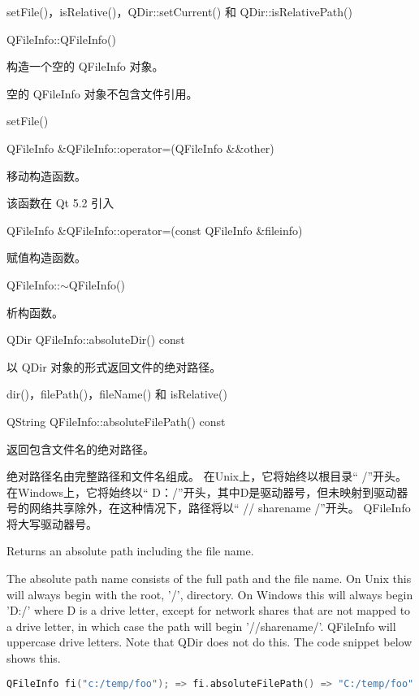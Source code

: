 \begin{notice}[另请参阅]
setFile()，isRelative()，QDir::setCurrent() 和
QDir::isRelativePath()
\end{notice}

QFileInfo::QFileInfo()

构造一个空的 QFileInfo 对象。



\begin{notice}
空的 QFileInfo 对象不包含文件引用。
\end{notice}


\begin{notice}[另请参阅]
 setFile()
\end{notice}


QFileInfo \&QFileInfo::operator=(QFileInfo \&\&other)

移动构造函数。

该函数在 Qt 5.2 引入

QFileInfo \&QFileInfo::operator=(const QFileInfo \&fileinfo)

赋值构造函数。

QFileInfo::$\sim$QFileInfo()

析构函数。

QDir QFileInfo::absoluteDir() const

以 QDir 对象的形式返回文件的绝对路径。


\begin{notice}[另请参阅]
dir()，filePath()，fileName() 和 isRelative()
\end{notice}

QString QFileInfo::absoluteFilePath() const

返回包含文件名的绝对路径。

绝对路径名由完整路径和文件名组成。 在Unix上，它将始终以根目录“ /”开头。 在Windows上，它将始终以“ D：/”开头，其中D是驱动器号，但未映射到驱动器号的网络共享除外，在这种情况下，路径将以“ // sharename /”开头。 QFileInfo 将大写驱动器号。

Returns an absolute path including the file name.

The absolute path name consists of the full path and the file name. On
Unix this will always begin with the root, '/', directory. On Windows
this will always begin 'D:/' where D is a drive letter, except for
network shares that are not mapped to a drive letter, in which case
the path will begin '//sharename/'. QFileInfo will uppercase drive
letters. Note that QDir does not do this. The code snippet below shows
this.

\begin{lstlisting}[language=C++]
QFileInfo fi("c:/temp/foo"); => fi.absoluteFilePath() => "C:/temp/foo"
\end{lstlisting}


